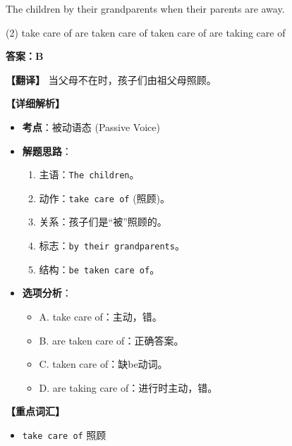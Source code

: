 \documentclass[11pt, a4paper]{article}
\newcommand{\analysis}[4]{
    \begin{solutionbox}
        \textbf{答案：#1}
        
        \textbf{【翻译】} #2
        
        \textbf{【详细解析】}
        #3
        
        \textbf{【重点词汇】}
        #4
    \end{solutionbox}
}
\newcommand{\blank}{\underline{\hspace{1.5cm}}}
\begin{document}
\begin{questions}
    \item The children \blank by their grandparents when their parents are away.
    \begin{tasks}(2)
        \task take care of \task are taken care of
        \task taken care of \task are taking care of
    \end{tasks}
    \analysis{B}{当父母不在时，孩子们由祖父母照顾。}{
        \begin{itemize}
            \item \textbf{考点}：被动语态 (Passive Voice)
            \item \textbf{解题思路}：
                \begin{enumerate}
                    \item 主语：\texttt{The children}。
                    \item 动作：\texttt{take care of} (照顾)。
                    \item 关系：孩子们是“被”照顾的。
                    \item 标志：\texttt{by their grandparents}。
                    \item 结构：\texttt{be taken care of}。
                \end{enumerate}
            \item \textbf{选项分析}：
                \begin{itemize}
                    \item A. take care of：主动，错。
                    \item B. are taken care of：正确答案。
                    \item C. taken care of：缺be动词。
                    \item D. are taking care of：进行时主动，错。
                \end{itemize}
        \end{itemize}
    }{
        \begin{itemize}
            \item \texttt{take care of} 照顾
        \end{itemize}
    }
\end{questions}

\end{document}
